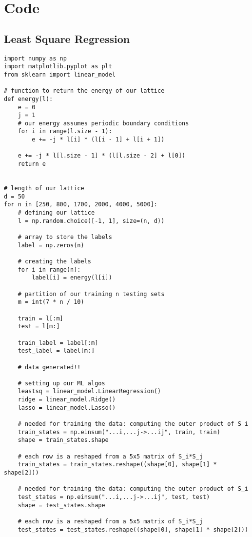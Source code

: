 \appendix
\section{Code}

\subsection{Least Square Regression}

\onecolumn
\begin{verbatim}
import numpy as np
import matplotlib.pyplot as plt
from sklearn import linear_model

# function to return the energy of our lattice
def energy(l):
    e = 0
    j = 1
    # our energy assumes periodic boundary conditions
    for i in range(l.size - 1):
        e += -j * l[i] * (l[i - 1] + l[i + 1])

    e += -j * l[l.size - 1] * (l[l.size - 2] + l[0])
    return e


# length of our lattice
d = 50
for n in [250, 800, 1700, 2000, 4000, 5000]:
    # defining our lattice
    l = np.random.choice([-1, 1], size=(n, d))

    # array to store the labels
    label = np.zeros(n)

    # creating the labels
    for i in range(n):
        label[i] = energy(l[i])

    # partition of our training n testing sets
    m = int(7 * n / 10)

    train = l[:m]
    test = l[m:]

    train_label = label[:m]
    test_label = label[m:]

    # data generated!!

    # setting up our ML algos
    leastsq = linear_model.LinearRegression()
    ridge = linear_model.Ridge()
    lasso = linear_model.Lasso()

    # needed for training the data: computing the outer product of S_i
    train_states = np.einsum("...i,...j->...ij", train, train)
    shape = train_states.shape

    # each row is a reshaped from a 5x5 matrix of S_i*S_j
    train_states = train_states.reshape((shape[0], shape[1] * shape[2]))

    # needed for training the data: computing the outer product of S_i
    test_states = np.einsum("...i,...j->...ij", test, test)
    shape = test_states.shape

    # each row is a reshaped from a 5x5 matrix of S_i*S_j
    test_states = test_states.reshape((shape[0], shape[1] * shape[2]))


\end{verbatim}
